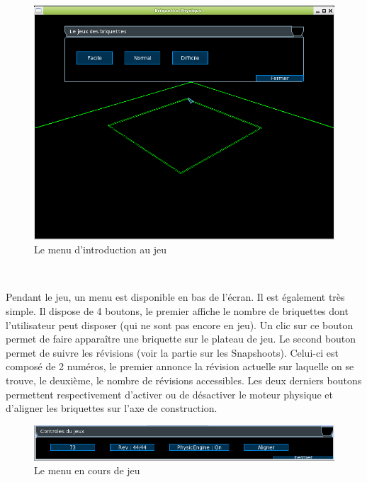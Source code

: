 \documentclass[frenchb,twoside]{EPURapport}
\begin{document}
\newpage

		\begin{figure}[h]
			\centering
			\includegraphics[width=16cm]{images/Menus_initial.png}
			\caption{\label{fig:menus_initial}Le menu d'introduction au jeu}
		\end{figure}
		
		\
		   
        Pendant le jeu, un menu est disponible en bas de l'écran. Il est
        également très simple. Il dispose de 4 boutons, le premier affiche le
        nombre de briquettes dont l'utilisateur peut disposer (qui ne sont pas
        encore en jeu). Un clic sur ce bouton permet de faire apparaître une
        briquette sur le plateau de jeu. Le second bouton permet de suivre les
        révisions (voir la partie sur les Snapshoots). Celui-ci est composé de 2
        numéros, le premier annonce la révision actuelle sur laquelle on se
        trouve, le deuxième, le nombre de révisions accessibles. Les deux
        derniers boutons permettent respectivement d'activer ou de désactiver le
        moteur physique et d'aligner les briquettes sur l'axe de construction.
		
		\begin{figure}[h]
			\centering
			\includegraphics[width=16cm]{images/menu_jeu.png}
			\caption{\label{fig:menu_jeu}Le menu en cours de jeu}
		\end{figure}
		
\end{document}
